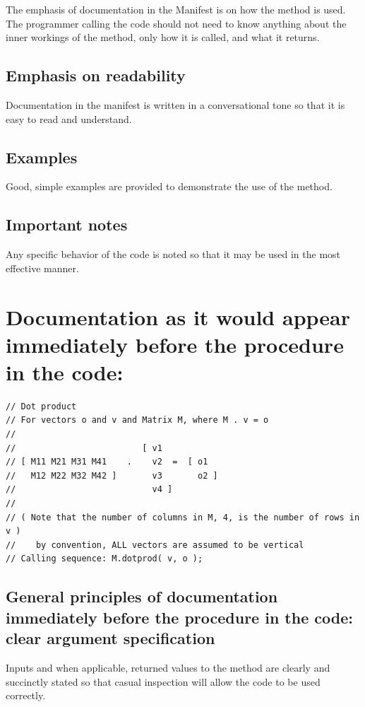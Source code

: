 \documentclass{report}
\begin{document}
The emphasis of documentation in the Manifest is on how the method is
used.  The programmer calling the code should not need to know
anything about the inner workings of the method, only how it is
called, and what it returns.

\subsection{Emphasis on readability}

Documentation in the manifest is written in a conversational tone so
that it is easy to read and understand.

\subsection{Examples}

Good, simple examples are provided to demonstrate the use of the
method.

\subsection{Important notes}

Any specific behavior of the code is noted so that it may be used in
the most effective manner.

\section{Documentation as it would appear immediately before the
procedure in the code:}

\begin{verbatim}
// Dot product
// For vectors o and v and Matrix M, where M . v = o
//
//                         [ v1
// [ M11 M21 M31 M41    .    v2  =  [ o1
//   M12 M22 M32 M42 ]       v3       o2 ]
//                           v4 ]
//
// ( Note that the number of columns in M, 4, is the number of rows in
v )
//    by convention, ALL vectors are assumed to be vertical
// Calling sequence: M.dotprod( v, o );
\end{verbatim}

\subsection{General principles of documentation immediately before the
procedure in the code: clear argument specification}

Inputs and when applicable, returned values to the method are clearly
and succinctly stated so that casual inspection will allow the code to
be used correctly.
\end{document}
